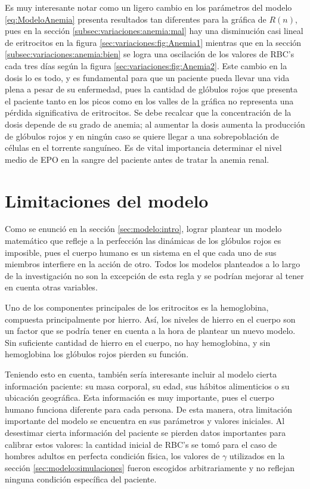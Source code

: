 Es muy interesante notar como un ligero cambio en los parámetros del modelo \ref{eq:ModeloAnemia} presenta resultados tan diferentes para la gráfica de $R(n)$, pues en la sección \ref{subsec:variaciones:anemia:mal} hay una disminución casi lineal de eritrocitos en la figura \ref{sec:variaciones:fig:Anemia1} mientras que en la sección \ref{subsec:variaciones:anemia:bien} se logra una oscilación de los valores de RBC's cada tres días según la figura \ref{sec:variaciones:fig:Anemia2}. Este cambio en la dosis lo es todo, y es fundamental para que un paciente pueda llevar una vida plena a pesar de su enfermedad, pues la cantidad de glóbulos rojos que presenta el paciente tanto en los picos como en los valles de la gráfica no representa una pérdida significativa de eritrocitos. Se debe recalcar que la concentración de la dosis depende de su grado de anemia; al aumentar la dosis aumenta la producción de glóbulos rojos y en ningún caso se quiere llegar a una sobrepoblación de células en el torrente sanguíneo. Es de vital importancia determinar el nivel medio de EPO en la sangre del paciente antes de tratar la anemia renal.

\section{Limitaciones del modelo}

Como se enunció en la sección \ref{sec:modelo:intro}, lograr plantear un modelo matemático que refleje a la perfección las dinámicas de los glóbulos rojos es imposible, pues el cuerpo humano es un sistema en el que cada uno de sus miembros interfiere en la acción de otro. Todos los modelos planteados a lo largo de la investigación no son la excepción de esta regla y se podrían mejorar al tener en cuenta otras variables.

Uno de los componentes principales de los eritrocitos es la hemoglobina, compuesta principalmente por hierro. Así, los niveles de hierro en el cuerpo son un factor que se podría tener en cuenta a la hora de plantear un nuevo modelo. Sin suficiente cantidad de hierro en el cuerpo, no hay hemoglobina, y sin hemoglobina los glóbulos rojos pierden su función.

Teniendo esto en cuenta, también sería interesante incluir al modelo cierta información paciente: su masa corporal, su edad, sus hábitos alimenticios o su ubicación geográfica. Esta información es muy importante, pues el cuerpo humano funciona diferente para cada persona. De esta manera, otra limitación importante del modelo se encuentra en sus parámetros y valores iniciales. Al desestimar cierta información del paciente se pierden datos importantes para calibrar estos valores: la cantidad inicial de RBC's se tomó para el caso de hombres adultos en perfecta condición física, los valores de $\gamma$ utilizados en la sección \ref{sec:modelo:simulaciones} fueron escogidos arbitrariamente y no reflejan ninguna condición específica del paciente. 

